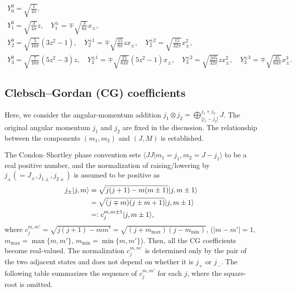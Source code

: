\documentclass[amsmath,amssymb,prc,aps]{revtex4-2}
\newcommand{\Blue}[1]{{\color[rgb]{0.0,0.0,1.0}\relax#1}}
\newcommand{\Cyan}[1]{{\color[rgb]{0.0,0.5,0.5}\relax#1}}
\begin{document}
\begin{subequations}
\begin{gather}
  Y_0^0 = \sqrt{\frac1{4\pi}}, \\
  Y_1^0
    = \sqrt{\frac{3}{4\pi}} z, \quad
  Y_1^{\pm}
    = \mp\sqrt{\frac{3}{8\pi}} x_\pm, \\
  Y_2^0 = \sqrt{\frac{5}{16\pi}} (3z^2-1), \quad
  Y_2^{\pm1} = \mp\sqrt{\frac{15}{8\pi}} zx_\pm, \quad
  Y_2^{\pm2} = \sqrt{\frac{15}{32\pi}} x_\pm^2, \\
  Y_3^0 = \sqrt{\frac{7}{16\pi}} (5z^2-3)z, \quad
  Y_3^{\pm1} = \mp\sqrt{\frac{21}{64\pi}} (5z^2-1)x_\pm, \quad
  Y_3^{\pm2} = \sqrt{\frac{105}{32\pi}} zx_\pm^2, \quad
  Y_3^{\pm3} = \mp\sqrt{\frac{35}{64\pi}} x_\pm^3.
\end{gather}
\end{subequations}

\subsection{Clebsch--Gordan (CG) coefficients}
\def\LadNH#1{\Blue{\stackrel{\times #1}{\leftrightarrow}}}
\def\LadNV#1{\Blue{\updownarrow\hspace{-0.25em}{\raisebox{0.10em}{\scriptsize$\times #1$}}}}

Here, we consider the angular-momentum addition $j_1\otimes j_2 =
\bigoplus_{|j_1-j_2|}^{j_1+j_2} J$.  The original angular momentum $j_1$ and
$j_2$ are fixed in the discussion.  The relationship between the components
$(m_1, m_2)$ and $(J, M)$ is established.

The Condon--Shortley phase convention sets \Cyan{$\langle J J |m_1 = j_1, m_2 =
J - j_1\rangle$} to be a real positive number, and the normalization of
raising/lowering by $j_\pm (= J_\pm, j_{1\pm}, j_{2\pm})$ is assumed to be
positive as
\begin{align}
  j_\pm |j,m\rangle
    &= \sqrt{j(j+1) - m(m\pm1)} | j, m\pm1\rangle \notag \\
    &= \sqrt{(j\mp m)(j\pm m + 1)} | j, m\pm1\rangle \notag \\
    &=: c_{j}^{m,m\pm1} |j, m\pm1\rangle,
\end{align}
where $c_j^{m,m'} = \sqrt{j(j+1)-mm'} =
\sqrt{(j+m_\mathrm{max})(j-m_\mathrm{min})}$, ($|m-m'|=1$,
$m_\mathrm{max}=\max\{m,m'\}$, $m_\mathrm{min}=\min\{m,m'\}$).  Then, all the
CG coefficients become real-valued.  The normalization $c_j^{m,m'}$ is
determined only by the pair of the two adjacent states and does not depend on
whether it is $j_+$ or $j_-$.  The following table summarizes the sequence of
$c_j^{m,m'}$ for each $j$, where the square-root is omitted.
\end{document}
